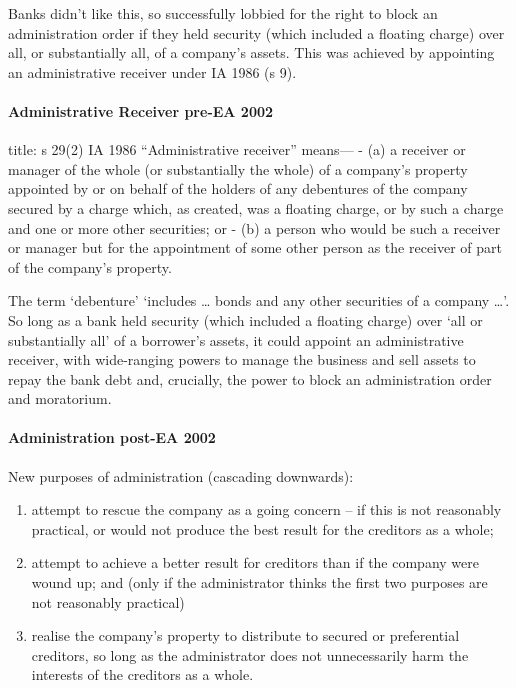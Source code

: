 \documentclass[
]{article}
\newenvironment{Shaded}{}{}
\newcommand{\NormalTok}[1]{#1}
\providecommand{\tightlist}{%
  \setlength{\itemsep}{0pt}\setlength{\parskip}{0pt}}
\begin{document}
Banks didn't like this, so successfully lobbied for the right to block
an administration order if they held security (which included a floating
charge) over all, or substantially all, of a company's assets. This was
achieved by appointing an administrative receiver under IA 1986 (s 9).

\hypertarget{administrative-receiver-pre-ea-2002}{%
\paragraph{Administrative Receiver pre-EA
2002}\label{administrative-receiver-pre-ea-2002}}

\begin{Shaded}
\begin{Highlighting}[]
\NormalTok{title: s 29(2) IA 1986}
\NormalTok{“Administrative receiver” means—}
\NormalTok{{-} (a) a receiver or manager of the whole (or substantially the whole) of a company’s property appointed by or on behalf of the holders of any debentures of the company secured by a charge which, as created, was a floating charge, or by such a charge and one or more other securities; or}
\NormalTok{{-} (b) a person who would be such a receiver or manager but for the appointment of some other person as the receiver of part of the company’s property.}
\end{Highlighting}
\end{Shaded}

The term `debenture' `includes \ldots{} bonds and any other securities
of a company \ldots{}'. So long as a bank held security (which included
a floating charge) over `all or substantially all' of a borrower's
assets, it could appoint an administrative receiver, with wide-ranging
powers to manage the business and sell assets to repay the bank debt
and, crucially, the power to block an administration order and
moratorium.

\hypertarget{administration-post-ea-2002}{%
\paragraph{Administration post-EA
2002}\label{administration-post-ea-2002}}

New purposes of administration (cascading downwards):

\begin{enumerate}
\def\labelenumi{\arabic{enumi}.}
\tightlist
\item
  attempt to rescue the company as a going concern -- if this is not
  reasonably practical, or would not produce the best result for the
  creditors as a whole;
\item
  attempt to achieve a better result for creditors than if the company
  were wound up; and (only if the administrator thinks the first two
  purposes are not reasonably practical)
\item
  realise the company's property to distribute to secured or
  preferential creditors, so long as the administrator does not
  unnecessarily harm the interests of the creditors as a whole.
\end{enumerate}
\end{document}
